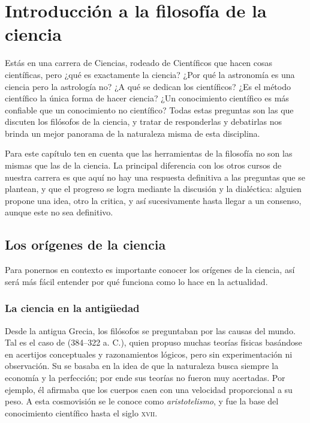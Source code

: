 \chapter{Introducción a la filosofía de la ciencia}
\label{cha:filosofiaciencia}

Estás en una carrera de Ciencias, rodeado de Científicos que hacen cosas
científicas, pero ¿qué es exactamente la ciencia?
¿Por qué la astronomía es una ciencia pero la astrología no?
¿A qué se dedican los científicos?
¿Es el método científico la única forma de hacer ciencia?
¿Un conocimiento científico es más confiable que un conocimiento no científico?
Todas estas preguntas son las que discuten los filósofos de la ciencia, y tratar
de responderlas y debatirlas nos brinda un mejor panorama de la naturaleza misma
de esta disciplina.

Para este capítulo ten en cuenta que las herramientas de la filosofía no son
las mismas que las de la ciencia.
La principal diferencia con los otros cursos de nuestra carrera es que aquí no
hay una respuesta definitiva a las preguntas que se plantean, y que el progreso
se logra mediante la discusión y la dialéctica: alguien propone una idea, otro
la critica, y así sucesivamente hasta llegar a un consenso, aunque este no sea
definitivo.

\section{Los orígenes de la ciencia}
\label{sec:losorigenesdelaciencia}

Para ponernos en contexto es importante conocer los orígenes de la ciencia, así
será más fácil entender por qué funciona como lo hace en la actualidad.

\subsection*{La ciencia en la antigüedad}
\label{sub:cienciaenlaantiguedad}
Desde la antigua Grecia, los filósofos se preguntaban por las causas del mundo.
Tal es el caso de  (384--322 a. C.), quien
propuso muchas teorías físicas basándose en acertijos conceptuales y
razonamientos lógicos, pero sin experimentación ni
observación\cite{Shields2023}.
Su  se basaba en la idea de que la naturaleza busca
siempre la economía y la perfección; por ende sus teorías no fueron muy
acertadas.
Por ejemplo, él afirmaba que los cuerpos caen con una velocidad proporcional a
su peso.
A esta cosmovisión se le conoce como \emph{aristotelismo}, y fue la base del
conocimiento científico hasta el siglo \textsc{xvii}.

